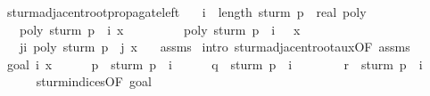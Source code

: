 \begin{isabellebody}
\isanewline
%
\endisadelimproof
\isanewline
\isanewline
{}\isamarkupfalse%
\ sturm{\isacharunderscore}adjacent{\isacharunderscore}root{\isacharunderscore}propagate{\isacharunderscore}left{\isacharcolon}\isanewline
\ \ \ {\isachardoublequoteopen}i\ {\isacharless}\ length\ {\isacharparenleft}sturm\ {\isacharparenleft}p\ {\isacharcolon}{\isacharcolon}\ real\ poly{\isacharparenright}{\isacharparenright}\ {\isacharminus}\ {}{\isachardoublequoteclose}\isanewline
\ \ \ {\isachardoublequoteopen}poly\ {\isacharparenleft}sturm\ p\ {\isacharbang}\ i{\isacharparenright}\ x\ {\isacharequal}\ {}{\isachardoublequoteclose}\isanewline
\ \ \ \ \ \ \ {\isachardoublequoteopen}poly\ {\isacharparenleft}sturm\ p\ {\isacharbang}\ {\isacharparenleft}i\ {\isacharplus}\ {}{\isacharparenright}{\isacharparenright}\ x\ {\isacharequal}\ {}{\isachardoublequoteclose}\isanewline
\ \ \ {\isachardoublequoteopen}{\isasymforall}j{\isasymle}i{\isacharplus}{}{\isachardot}\ poly\ {\isacharparenleft}sturm\ p\ {\isacharbang}\ j{\isacharparenright}\ x\ {\isacharequal}\ {}{\isachardoublequoteclose}\isanewline
%
\isadelimproof
%
\endisadelimproof
%
\isatagproof
{}\isamarkupfalse%
\ assms{\isacharparenleft}{}{\isacharparenright}\isanewline
{}\isamarkupfalse%
\ {\isacharparenleft}intro\ sturm{\isacharunderscore}adjacent{\isacharunderscore}root{\isacharunderscore}aux{\isacharbrackleft}OF\ assms{\isacharparenleft}{}{\isacharcomma}{}{\isacharcomma}{}{\isacharparenright}{\isacharbrackright}{\isacharparenright}\isanewline
\ \ \isamarkupfalse%
\ {\isacharparenleft}goal{}\ i\ x{\isacharparenright}\isanewline
\ \ \ \ \isamarkupfalse%
\ {\isacharquery}p\ {\isacharequal}\ {\isachardoublequoteopen}sturm\ p\ {\isacharbang}\ i{\isachardoublequoteclose}\isanewline
\ \ \ \ \isamarkupfalse%
\ {\isacharquery}q\ {\isacharequal}\ {\isachardoublequoteopen}sturm\ p\ {\isacharbang}\ {\isacharparenleft}i\ {\isacharplus}\ {}{\isacharparenright}{\isachardoublequoteclose}\isanewline
\ \ \ \ \isamarkupfalse%
\ {\isacharquery}r\ {\isacharequal}\ {\isachardoublequoteopen}sturm\ p\ {\isacharbang}\ {\isacharparenleft}i\ {\isacharplus}\ {}{\isacharparenright}{\isachardoublequoteclose}\isanewline
\ \ \ \ \isamarkupfalse%
\ sturm{\isacharunderscore}indices{\isacharbrackleft}OF\ goal{}{\isacharparenleft}{}{\isacharparenright}{\isacharbrackright}\ \isamarkupfalse%

\end{isabellebody}
